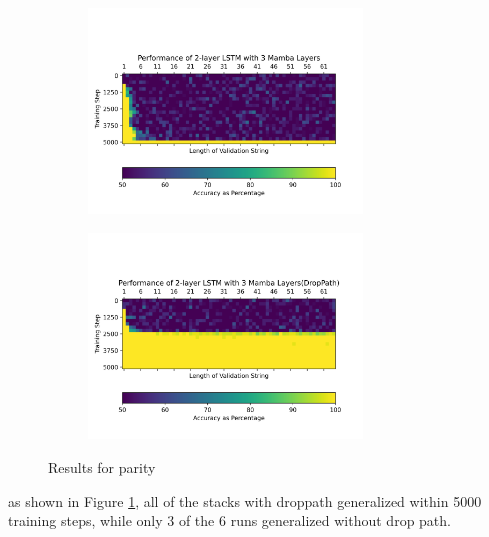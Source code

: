 \begin{figure}
\begin{subfigure}{0.5\textwidth}
\begin{center}
        \includegraphics[width=0.8\textwidth]{figures/parity_lstm_False_5_2.png.png}
        \end{center}
    \end{subfigure}\begin{subfigure}{0.5\textwidth}
        \begin{center}
        \includegraphics[width=0.8\textwidth]{figures/parity_lstm_True_5_2.png.png}
        \end{center}
    \end{subfigure}
    \caption{Results for parity}
    \label{droppathresults}
\end{figure}
as shown in Figure \ref{droppathresults}, all of the stacks with droppath
generalized within 5000 training steps, while only 3 of the 6 runs generalized
without drop path.

